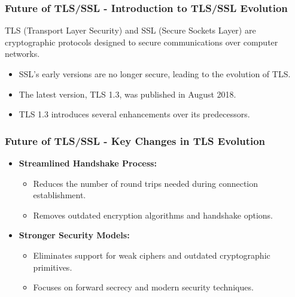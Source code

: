 \documentclass{beamer}
\begin{document}
\begin{frame}[fragile]
    \frametitle{Future of TLS/SSL - Introduction to TLS/SSL Evolution}
    TLS (Transport Layer Security) and SSL (Secure Sockets Layer) are cryptographic protocols designed to secure communications over computer networks. 
    \begin{itemize}
        \item SSL's early versions are no longer secure, leading to the evolution of TLS.
        \item The latest version, TLS 1.3, was published in August 2018.
        \item TLS 1.3 introduces several enhancements over its predecessors.
    \end{itemize}
\end{frame}

\begin{frame}[fragile]
    \frametitle{Future of TLS/SSL - Key Changes in TLS Evolution}
    \begin{itemize}
        \item \textbf{Streamlined Handshake Process:} 
            \begin{itemize}
                \item Reduces the number of round trips needed during connection establishment.
                \item Removes outdated encryption algorithms and handshake options.
            \end{itemize}
        \item \textbf{Stronger Security Models:} 
            \begin{itemize}
                \item Eliminates support for weak ciphers and outdated cryptographic primitives.
                \item Focuses on forward secrecy and modern security techniques.
            \end{itemize}
    \end{itemize}
\end{frame}
\end{document}
